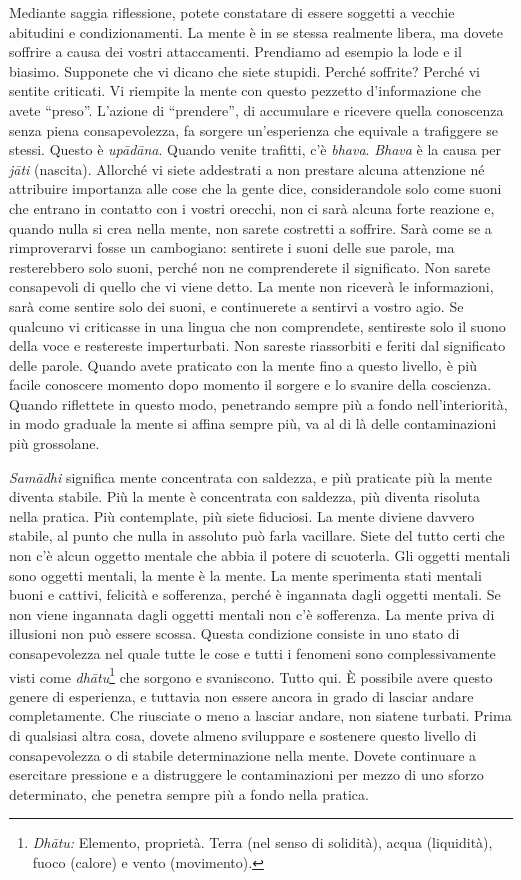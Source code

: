 Mediante saggia riflessione, potete constatare di essere soggetti a
vecchie abitudini e condizionamenti. La mente è in se stessa realmente
libera, ma dovete soffrire a causa dei vostri attaccamenti. Prendiamo ad
esempio la lode e il biasimo. Supponete che vi dicano che siete stupidi.
Perché soffrite? Perché vi sentite criticati. Vi riempite la mente con
questo pezzetto d'informazione che avete ``preso''. L'azione di
``prendere'', di accumulare e ricevere quella conoscenza senza piena
consapevolezza, fa sorgere un'esperienza che equivale a trafiggere se
stessi. Questo è \emph{upādāna}. Quando venite trafitti, c'è
\emph{bhava}. \emph{Bhava} è la causa per \emph{jāti} (nascita).
Allorché vi siete addestrati a non prestare alcuna attenzione né
attribuire importanza alle cose che la gente dice, considerandole solo
come suoni che entrano in contatto con i vostri orecchi, non ci sarà
alcuna forte reazione e, quando nulla si crea nella mente, non sarete
costretti a soffrire. Sarà come se a rimproverarvi fosse un cambogiano:
sentirete i suoni delle sue parole, ma resterebbero solo suoni, perché
non ne comprenderete il significato. Non sarete consapevoli di quello
che vi viene detto. La mente non riceverà le informazioni, sarà come
sentire solo dei suoni, e continuerete a sentirvi a vostro agio. Se
qualcuno vi criticasse in una lingua che non comprendete, sentireste
solo il suono della voce e restereste imperturbati. Non sareste
riassorbiti e feriti dal significato delle parole. Quando avete
praticato con la mente fino a questo livello, è più facile conoscere
momento dopo momento il sorgere e lo svanire della coscienza. Quando
riflettete in questo modo, penetrando sempre più a fondo
nell'interiorità, in modo graduale la mente si affina sempre più, va al
di là delle contaminazioni più grossolane.

\emph{Samādhi} significa mente concentrata con saldezza, e più praticate
più la mente diventa stabile. Più la mente è concentrata con saldezza,
più diventa risoluta nella pratica. Più contemplate, più siete
fiduciosi. La mente diviene davvero stabile, al punto che nulla in
assoluto può farla vacillare. Siete del tutto certi che non c'è alcun
oggetto mentale che abbia il potere di scuoterla. Gli oggetti mentali
sono oggetti mentali, la mente è la mente. La mente sperimenta stati
mentali buoni e cattivi, felicità e sofferenza, perché è ingannata dagli
oggetti mentali. Se non viene ingannata dagli oggetti mentali non c'è
sofferenza. La mente priva di illusioni non può essere scossa. Questa
condizione consiste in uno stato di consapevolezza nel quale tutte le
cose e tutti i fenomeni sono complessivamente visti come
\emph{dhātu}\footnote{\emph{Dhātu:} Elemento, proprietà. Terra (nel
  senso di solidità), acqua (liquidità), fuoco (calore) e vento
  (movimento).} che sorgono e svaniscono. Tutto qui. È possibile avere
questo genere di esperienza, e tuttavia non essere ancora in grado di
lasciar andare completamente. Che riusciate o meno a lasciar andare, non
siatene turbati. Prima di qualsiasi altra cosa, dovete almeno sviluppare
e sostenere questo livello di consapevolezza o di stabile determinazione
nella mente. Dovete continuare a esercitare pressione e a distruggere le
contaminazioni per mezzo di uno sforzo determinato, che penetra sempre
più a fondo nella pratica.

